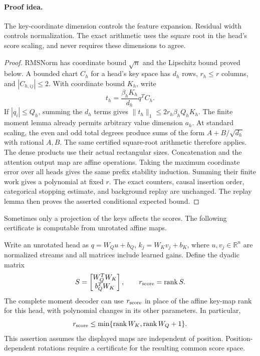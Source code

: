 \paragraph{Proof idea.}
The key-coordinate dimension controls the feature expansion.
Residual width controls normalization. The exact arithmetic uses
the square root in the head's score scaling, and never requires
these dimensions to agree.

\begin{proof}
RMSNorm has coordinate bound $\sqrt n$ and the Lipschitz bound
proved below. A bounded chart $C_h$ for a head's key space has
$d_h$ rows, $r_h\le r$ columns, and $|C_{h,ij}|\le2$.
With coordinate bound $K_h$, write
\[
 t_h=\frac{\beta_hK_h}{d_h}q^TC_h.
\]
If $|q_i|\le Q_h$, summing the $d_h$ terms gives
$\|t_h\|_1\le2r_h\beta_hQ_hK_h$.
The finite moment lemma already permits arbitrary value
dimension $a_h$.
At standard scaling, the even and odd total degrees produce
sums of the form $A+B/\sqrt{d_h}$ with rational $A,B$.
The same certified square-root arithmetic therefore applies.
The dense products use their actual rectangular sizes.
Concatenation and the attention output map are affine operations.
Taking the maximum coordinate error over all heads gives the
same prefix stability induction. Summing their finite work gives
a polynomial at fixed $r$.
The exact counters, causal insertion order, categorical stopping
estimate, and background replay are unchanged. The replay lemma
then proves the asserted conditional expected bound.
\end{proof}

Sometimes only a projection of the keys affects the scores. The
following certificate is computable from unrotated affine maps.

\begin{corollary}
\label{cor:checkpoint-score-rank}
Write an unrotated head as
$q=W_Qu+b_Q$, $k_j=W_Kv_j+b_K$, where $u,v_j\in\mathbb R^n$
are normalized streams and all matrices include learned gains.
Define the dyadic matrix
\[
 S=\begin{bmatrix}W_Q^TW_K\\ b_Q^TW_K\end{bmatrix},
 \qquad r_{\rm score}=\operatorname{rank}S.
\]
The complete moment decoder can use $r_{\rm score}$ in place
of the affine key-map rank for this head, with polynomial changes
in its other parameters. In particular,
\[
 r_{\rm score}\le
 \min\{\operatorname{rank}W_K,\operatorname{rank}W_Q+1\}.
\]
This assertion assumes the displayed maps are independent of
position. Position-dependent rotations require a certificate for
the resulting common score space.
\end{corollary}

